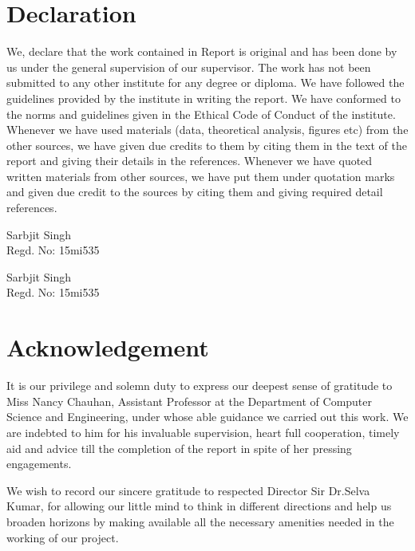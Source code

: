 \documentclass[a4paper,12 pt,oneside]{book}
\begin{document}
\chapter*{\centering Declaration}

We, declare that the work contained in Report is original and has been done by us under the general supervision of our supervisor. The work has not been submitted to any other institute for any degree or diploma. We have followed the guidelines provided by the institute in writing the report. We have conformed to the norms and guidelines given in the Ethical Code of Conduct of the institute. Whenever we have used materials (data, theoretical analysis, figures etc) from the other sources,  we have given due credits to them by citing them in the text of the report and giving their details in the references. Whenever we have quoted written materials from other sources, we have put them under quotation marks and given due credit to the sources by citing them and giving required detail references.

\vspace{2cm}
\hfill\begin{varwidth}{\textwidth}
Sarbjit Singh\\
Regd. No: 15mi535


\vspace{1.0cm}

Sarbjit Singh\\
Regd. No: 15mi535

\end{varwidth}

\chapter*{\centering Acknowledgement}

It is our privilege and solemn duty to express our deepest sense of gratitude to Miss Nancy Chauhan, Assistant Professor at the Department of Computer Science and Engineering, under whose able guidance we carried out this work. We are indebted to him for his invaluable supervision, heart full cooperation, timely aid and advice till the completion of the report in spite of her pressing engagements.

We wish to record our sincere gratitude to respected Director Sir
Dr.Selva Kumar, for allowing our little mind to think in different directions and help us broaden horizons by making available all the necessary amenities needed in the working of our
project.
\end{document}
